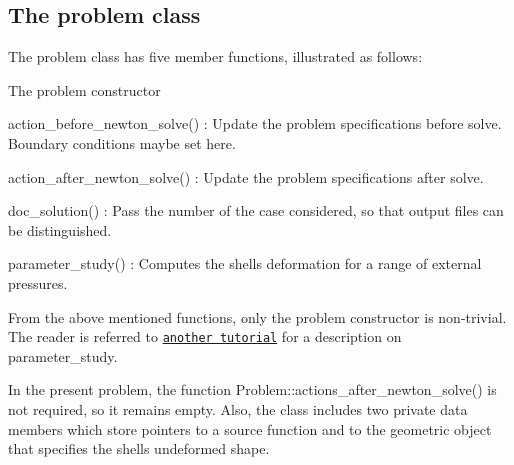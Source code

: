 \hypertarget{index_problem}{}\subsection{The problem class}\label{index_problem}
The problem class has five member functions, illustrated as follows\+:


\begin{DoxyItemize}
\item The problem constructor
\item {\ttfamily action\+\_\+before\+\_\+newton\+\_\+solve()} \+: Update the problem specifications before solve. Boundary conditions maybe set here.
\item {\ttfamily action\+\_\+after\+\_\+newton\+\_\+solve()} \+: Update the problem specifications after solve.
\item {\ttfamily doc\+\_\+solution()} \+: Pass the number of the case considered, so that output files can be distinguished.
\item {\ttfamily parameter\+\_\+study()} \+: Computes the shell\textquotesingle{}s deformation for a range of external pressures.
\end{DoxyItemize}From the above mentioned functions, only the problem constructor is non-\/trivial. The reader is referred to \href{../../../beam/tensioned_string/html/index.html}{\tt another tutorial} for a description on {\ttfamily parameter\+\_\+study}.

In the present problem, the function {\ttfamily Problem\+::actions\+\_\+after\+\_\+newton\+\_\+solve()} is not required, so it remains empty. Also, the class includes two private data members which store pointers to a source function and to the geometric object that specifies the shell\textquotesingle{}s undeformed shape.

